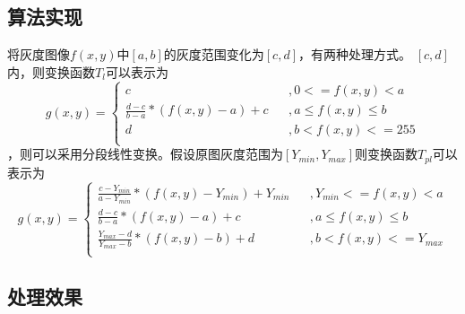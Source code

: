 \documentclass[UTF8]{ctexart}
\begin{document}
		\subsection{算法实现}
		将灰度图像$f(x,y)$中$[a,b]$的灰度范围变化为$[c,d]$，有两种处理方式。\newline
		$[c,d]$内，则变换函数$T_l$可以表示为
		\[
		g(x,y)=\left\{
		\begin{array}{lcl}
		c & & ,{0 <= f(x,y) < a} \\
		\frac{d-c}{b-a} * (f(x,y)-a) + c & & ,{a \leq f(x,y) \leq b} \\
		d & & ,{b < f(x,y) <= 255} \\
		\end{array}\right.
		\]
		，则可以采用分段线性变换。假设原图灰度范围为$[Y_{min},Y_{max}]$则变换函数$T_{pl}$可以表示为
		\[
		g(x,y)=\left\{
		\begin{array}{lcl}
		\frac{c-Y_{min}}{a-Y_{min}} * (f(x,y)-Y_{min}) + Y_{min} & & ,{Y_{min} <= f(x,y) < a} \\
		\frac{d-c}{b-a} * (f(x,y)-a) + c & & ,{a \leq f(x,y) \leq b} \\
		\frac{Y_{max}-d}{Y_{max}-b} * (f(x,y)-b) + d & & ,{b < f(x,y) <= Y_{max}} \\
		\end{array}\right.
		\]


		\subsection{处理效果}
\end{document}
